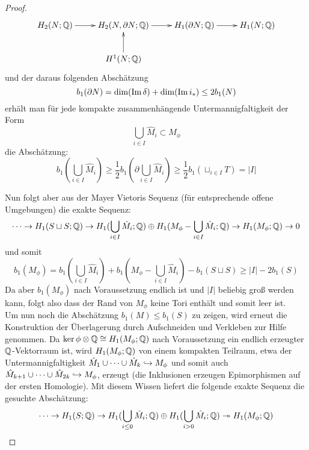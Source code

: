 \begin{proof}
	\[
	 \begin{xy}
	 	\xymatrix{
	 	H_2(N;\QQ) \ar[r]&  H_2(N,\partial N ; \QQ) \ar[r]& H_1(\partial N;\QQ) \ar[r]& H_1(N;\QQ) \\
	 	& H^1(N;\QQ)\ar[u]&&}
	 \end{xy}
	 \] 
	 und der daraus folgenden Abschätzung
	 \[
	 	b_1(\partial N) = \dim(\operatorname{Im} \delta) + \dim(\operatorname{Im} i_*) \leq  2b_1(N)
	 \]
	 erhält man für jede kompakte zusammenhängende Untermannigfaltigkeit der Form
	 \[
	  	\bigcup_{i\in I} \hat M_i \subset M_\phi
	  \]
	  die Abschätzung:
	  \[
	   	b_1(\bigcup_{i\in I} \hat M_i)\geq \frac{1}{2}b_1(\partial \bigcup_{i\in I} \hat M_i) \geq \frac{1}{2}b_1(\sqcup_{i \in I}T) = |I|
	  \]


	  Nun folgt aber aus der Mayer Vietoris Sequenz (für entsprechende offene Umgebungen) die exakte Sequenz:
	  \[
	  	\cdots\to H_1(S\sqcup S;\mathbb{Q}) \to H_1(\bigcup_{i \in I} \hat M_i;\mathbb{Q}) \oplus H_1(M_\phi -\bigcup_{i \in I} \hat M_i;\mathbb{Q}) \to H_1(M_\phi;\mathbb{Q}) \to 0
	  \]
	  und somit
	  \[
	  	b_1(M_\phi)= b_1(\bigcup_{i \in I} \hat M_i)+b_1(M_\phi -\bigcup_{i \in I} \hat M_i)-b_1(S\sqcup S) \geq |I| -2b_1(S)
	  \]
	  Da aber $b_1(M_\phi)$ nach Voraussetzung endlich ist und $|I|$ beliebig groß werden kann, folgt also dass der Rand von $M_\phi$ keine Tori enthält und somit leer ist.\\
	  Um nun noch die Abschätzung $b_1(M) \leq b_1(S)$ zu zeigen, wird erneut die Konstruktion der Überlagerung durch Aufschneiden und Verkleben zur Hilfe genommen. Da $\ker\phi \otimes \mathbb{Q} \cong H_1(M_\phi;\mathbb{Q})$ nach Voraussetzung ein endlich erzeugter $\mathbb{Q}$-Vektorraum ist, wird $H_1(M_\phi;\mathbb{Q})$ von einem kompakten Teilraum, etwa der Untermannigfaltigkeit $\hat M_1 \cup \cdots \cup \hat M_k \hookrightarrow M_\phi$ und somit auch $\hat M_{k+1} \cup \cdots \cup \hat M_{2k}\hookrightarrow M_\phi$, erzeugt (die Inklusionen erzeugen Epimorphismen auf der ersten Homologie). Mit diesem Wissen liefert die folgende exakte Sequenz die gesuchte Abschätzung:
	  \[
	  	\cdots \to H_1(S;\mathbb{Q}) \to H_1(\bigcup_{i\leq 0}\hat M_i;\mathbb{Q}) \oplus H_1(\bigcup_{i>0} \hat M_i;\mathbb{Q}) \twoheadrightarrow H_1(M_\phi;\mathbb{Q})
	  \]
\end{proof}

